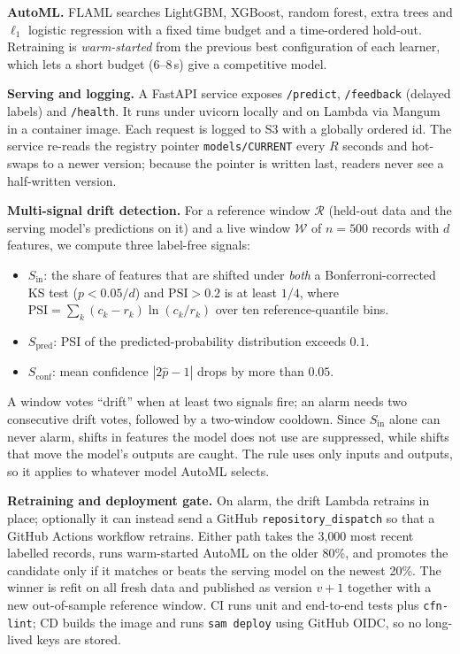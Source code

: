 \documentclass[conference]{IEEEtran}
\begin{document}
\textbf{AutoML.} FLAML searches LightGBM, XGBoost, random forest, extra trees and $\ell_1$ logistic regression with a fixed time budget and a time-ordered hold-out. Retraining is \emph{warm-started} from the previous best configuration of each learner, which lets a short budget (6--8\,s) give a competitive model.

\textbf{Serving and logging.} A FastAPI service exposes \texttt{/predict}, \texttt{/feedback} (delayed labels) and \texttt{/health}. It runs under uvicorn locally and on Lambda via Mangum in a container image. Each request is logged to S3 with a globally ordered id. The service re-reads the registry pointer \texttt{models/CURRENT} every $R$ seconds and hot-swaps to a newer version; because the pointer is written last, readers never see a half-written version.

\textbf{Multi-signal drift detection.} For a reference window $\mathcal{R}$ (held-out data and the serving model's predictions on it) and a live window $\mathcal{W}$ of $n{=}500$ records with $d$ features, we compute three label-free signals:
\begin{itemize}
\item $S_\text{in}$: the share of features that are shifted under \emph{both} a Bonferroni-corrected KS test ($p < 0.05/d$) and $\text{PSI} > 0.2$ is at least $1/4$, where
$\text{PSI}=\sum_{k}(c_k-r_k)\ln(c_k/r_k)$ over ten reference-quantile bins.
\item $S_\text{pred}$: PSI of the predicted-probability distribution exceeds $0.1$.
\item $S_\text{conf}$: mean confidence $|2\hat p-1|$ drops by more than $0.05$.
\end{itemize}
A window votes ``drift'' when at least two signals fire; an alarm needs two consecutive drift votes, followed by a two-window cooldown. Since $S_\text{in}$ alone can never alarm, shifts in features the model does not use are suppressed, while shifts that move the model's outputs are caught. The rule uses only inputs and outputs, so it applies to whatever model AutoML selects.

\textbf{Retraining and deployment gate.} On alarm, the drift Lambda retrains in place; optionally it can instead send a GitHub \texttt{repository\_dispatch} so that a GitHub Actions workflow retrains. Either path takes the 3{,}000 most recent labelled records, runs warm-started AutoML on the older 80\%, and promotes the candidate only if it matches or beats the serving model on the newest 20\%. The winner is refit on all fresh data and published as version $v{+}1$ together with a new out-of-sample reference window. CI runs unit and end-to-end tests plus \texttt{cfn-lint}; CD builds the image and runs \texttt{sam deploy} using GitHub OIDC, so no long-lived keys are stored.
\end{document}
